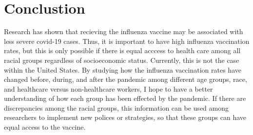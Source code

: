 \documentclass[12pt]{article}
\begin{document}
\section*{Conclustion}
\label{sec:Conclusion}
Research has shown that recieving the influenza vaccine may be associated with less severe covid-19 cases. Thus, it is important to have high influenza vaccination
rates, but this is only possible if there is equal acccess to health care among all racial groups regardless of socioeconomic status. Currently, this is not the case
within the United States. By studying how the influenza vaccination rates have changed before, during, and after the pandemic among different age groups, race, and
healthcare versus non-healthcare workers, I hope to have a better understanding of how each group has been effected by the pandemic. If there are discrepancies among the 
racial groups, this information can be used among researchers to implement new polices or strategies, so that these groups can have equal access to the vaccine. 



\end{document}

